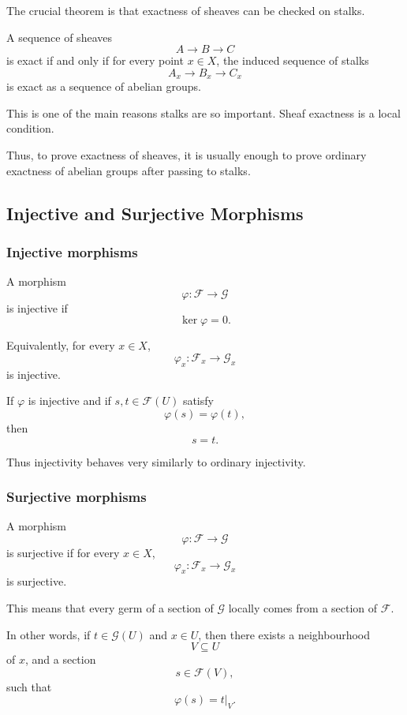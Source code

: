 The crucial theorem is that exactness of sheaves can be checked on stalks.

\begin{theorem}
	A sequence of sheaves
	\[
	A\longrightarrow B\longrightarrow C
	\]
	is exact if and only if for every point \(x\in X\), the induced sequence of stalks
	\[
	A_x\longrightarrow B_x\longrightarrow C_x
	\]
	is exact as a sequence of abelian groups.
\end{theorem}

\begin{remark}
	This is one of the main reasons stalks are so important. Sheaf exactness is a local condition.
\end{remark}

Thus, to prove exactness of sheaves, it is usually enough to prove ordinary exactness of abelian groups after passing to stalks.

\subsection{Injective and Surjective Morphisms}

\subsubsection{Injective morphisms}

A morphism
\[
\varphi:\mathcal{F}\to \mathcal{G}
\]
is injective if
\[
\ker\varphi=0.
\]

Equivalently, for every \(x\in X\),
\[
\varphi_x:\mathcal{F}_x\to \mathcal{G}_x
\]
is injective.

If \(\varphi\) is injective and if \(s,t\in \mathcal{F}(U)\) satisfy
\[
\varphi(s)=\varphi(t),
\]
then
\[
s=t.
\]

Thus injectivity behaves very similarly to ordinary injectivity.

\subsubsection{Surjective morphisms}

A morphism
\[
\varphi:\mathcal{F}\to \mathcal{G}
\]
is surjective if for every \(x\in X\),
\[
\varphi_x:\mathcal{F}_x\to \mathcal{G}_x
\]
is surjective.

This means that every germ of a section of \(\mathcal{G}\) locally comes from a section of \(\mathcal{F}\).

In other words, if \(t\in \mathcal{G}(U)\) and \(x\in U\), then there exists a neighbourhood
\[
V\subseteq U
\]
of \(x\), and a section
\[
s\in \mathcal{F}(V),
\]
such that
\[
\varphi(s)=t|_V.
\]


